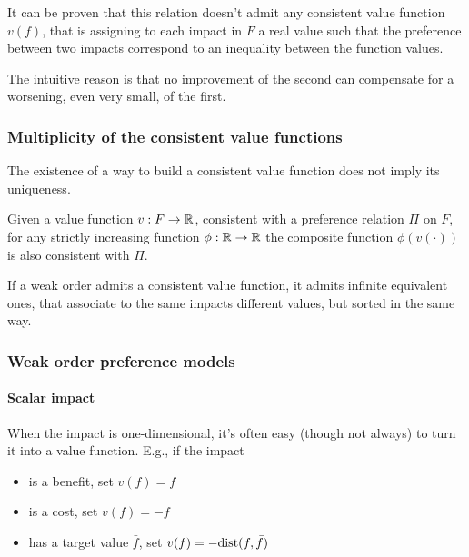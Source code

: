 It can be proven that this relation doesn't admit any consistent value function $v(f)$, that is assigning to each impact in $F$ a real value such that the preference between two impacts correspond to an inequality between the function values.

The intuitive reason is that no improvement of the second can compensate for a worsening, even very small, of the first.

\subsubsection{Multiplicity of the consistent value functions}
\label{subsubsec:multeplicityvalfunc}

The existence of a way to build a consistent value function does not imply its uniqueness. \\

\begin{theo}
	Given a value function $v: F \rightarrow \operatorname{\mathbb{R}}$, consistent with a preference relation $\Pi$ on $F$, for any strictly increasing function $\phi: \operatorname{\mathbb{R}} \rightarrow \operatorname{\mathbb{R}}$ the composite function $\phi(v(\cdot))$ is also consistent with $\Pi$.
\end{theo}

If a weak order admits a consistent value function, it admits infinite equivalent ones, that associate to the same impacts different values, but sorted in the same way.


\subsubsection{Weak order preference models}

\paragraph{Scalar impact} When the impact is one-dimensional, it's often easy (though not always) to turn it into a value function. E.g., if the impact
\begin{itemize}
	\item is a benefit, set $v(f) = f$
	
	\item is a cost, set $v(f) = -f$
	
	\item has a target value $\bar f$, set $v(f) = - \text{dist}(f, \bar f)$
\end{itemize}

